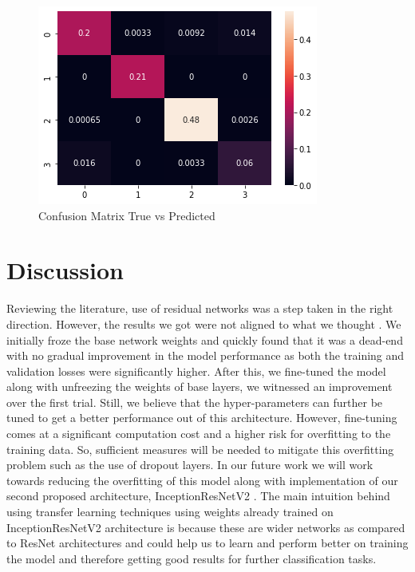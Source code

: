 \documentclass{report}
\begin{document}
\begin{figure}[H]
\centering
\includegraphics[width=\textwidth]{Confusion_matrix.png}
\caption{Confusion Matrix True vs Predicted}
\label{fig:CM}
\end{figure}



\section{Discussion}

Reviewing the literature, use of residual networks was a step taken in the right direction. However, the results we got were not aligned to what we thought \cite{theckedath2020detecting}. We initially froze the base network weights and quickly found that it was a dead-end with no gradual improvement in the model performance as both the training and validation losses were significantly higher. After this, we fine-tuned the model along with unfreezing the weights of base layers, we witnessed an improvement over the first trial. Still, we believe that the hyper-parameters can further be tuned to get a better performance out of this architecture. However, fine-tuning comes at a significant computation cost and a higher risk for overfitting to the training data. So, sufficient measures will be needed to mitigate this overfitting problem such as the use of dropout layers. In our future work we will work towards reducing the overfitting of this model along with implementation of our second proposed architecture, InceptionResNetV2 . The main intuition behind using transfer learning techniques using weights already trained on InceptionResNetV2  architecture is because these are wider networks as compared to ResNet architectures and could help us to learn and perform better on training the model and therefore getting good results for further classification tasks.
\end{document}
